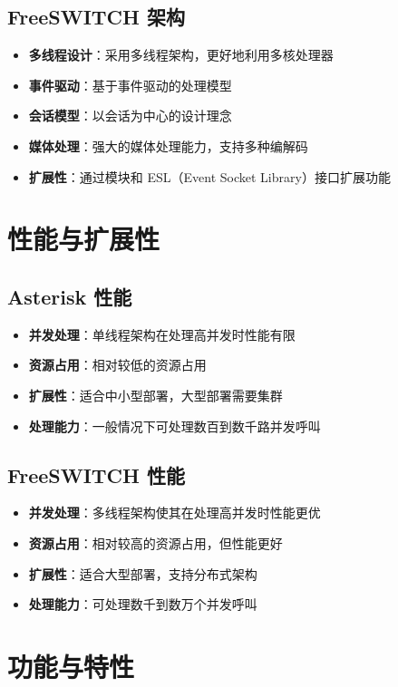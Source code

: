 \documentclass[12pt,UTF8]{ctexbook}
\begin{document}
\section{FreeSWITCH 架构}

\begin{itemize}
  \item \textbf{多线程设计}：采用多线程架构，更好地利用多核处理器
  \item \textbf{事件驱动}：基于事件驱动的处理模型
  \item \textbf{会话模型}：以会话为中心的设计理念
  \item \textbf{媒体处理}：强大的媒体处理能力，支持多种编解码
  \item \textbf{扩展性}：通过模块和 ESL（Event Socket Library）接口扩展功能
\end{itemize}

\chapter{性能与扩展性}
\section{Asterisk 性能}

\begin{itemize}
  \item \textbf{并发处理}：单线程架构在处理高并发时性能有限
  \item \textbf{资源占用}：相对较低的资源占用
  \item \textbf{扩展性}：适合中小型部署，大型部署需要集群
  \item \textbf{处理能力}：一般情况下可处理数百到数千路并发呼叫
\end{itemize}

\section{FreeSWITCH 性能}

\begin{itemize}
  \item \textbf{并发处理}：多线程架构使其在处理高并发时性能更优
  \item \textbf{资源占用}：相对较高的资源占用，但性能更好
  \item \textbf{扩展性}：适合大型部署，支持分布式架构
  \item \textbf{处理能力}：可处理数千到数万个并发呼叫
\end{itemize}

\chapter{功能与特性}
\end{document}
